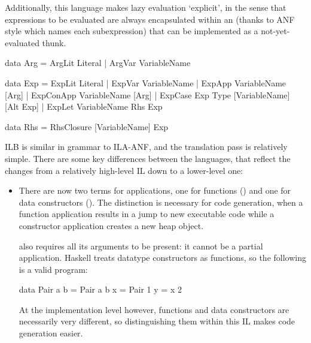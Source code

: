 \documentclass[dissertation.tex]{subfiles}
\begin{document}
{{{            Additionally, this language makes lazy evaluation `explicit', in the sense that expressions to be evaluated
            are always encapsulated within an  (thanks to ANF style which names each subexpression)
            that can be implemented as a not-yet-evaluated thunk.

            \begin{haskellfigure}
            data Arg = ArgLit Literal
                     | ArgVar VariableName

            data Exp = ExpLit Literal
                     | ExpVar VariableName
                     | ExpApp VariableName [Arg]
                     | ExpConApp VariableName [Arg]
                     | ExpCase Exp Type [VariableName] [Alt Exp]
                     | ExpLet VariableName Rhs Exp

            data Rhs = RhsClosure [VariableName] Exp
            \end{haskellfigure}

            ILB is similar in grammar to ILA-ANF, and the translation pass is relatively simple. There are some key
            differences between the languages, that reflect the changes from a relatively high-level IL down to a
            lower-level one:

            \begin{itemize}
            \item
            {

                There are now two terms for applications, one for functions () and one for data
                constructors (). The distinction is necessary for code generation, when a function
                application results in a jump to new executable code while a constructor application creates a new heap
                object.

                 also requires all its arguments to be present: it cannot be a partial application.
                Haskell treats datatype constructors as functions, so the following is a valid program:

                \begin{haskellfigure}
                data Pair a b = Pair a b
                x = Pair 1
                y = x 2
                \end{haskellfigure}

                At the implementation level however, functions and data constructors are necessarily very different, so
                distinguishing them within this IL makes code generation easier.

}
\end{itemize}}}}
\end{document}
